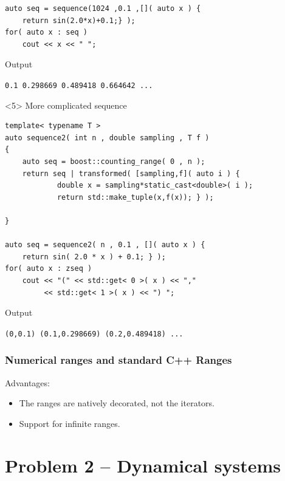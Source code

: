 \documentclass{beamer}
\newcommand{\heading}[1]{\frametitle{#1}}
\newcommand{\sectionslide}[1]{\frame{\begin{centerline}{\LARGE #1}\end{centerline}}}
\begin{document}
\begin{frame}[fragile]
\begin{onlyenv}
\begin{lstlisting}[basicstyle=\scriptsize\ttfamily]
auto seq = sequence(1024 ,0.1 ,[]( auto x ) {
    return sin(2.0*x)+0.1;} );
for( auto x : seq )
    cout << x << " ";
\end{lstlisting}
\vspace{2ex}Output

\vspace{0.5ex}\lstinline$0.1 0.298669 0.489418 0.664642 ...$
 \end{onlyenv}
 \begin{onlyenv}<5>
  More complicated sequence
\begin{lstlisting}[basicstyle=\scriptsize\ttfamily]
template< typename T >
auto sequence2( int n , double sampling , T f )
{
    auto seq = boost::counting_range( 0 , n );
    return seq | transformed( [sampling,f]( auto i ) {
            double x = sampling*static_cast<double>( i );
            return std::make_tuple(x,f(x)); } );

}

auto seq = sequence2( n , 0.1 , []( auto x ) {
    return sin( 2.0 * x ) + 0.1; } );
for( auto x : zseq )
    cout << "(" << std::get< 0 >( x ) << ","
         << std::get< 1 >( x ) << ") ";
\end{lstlisting}
\vspace{2ex}Output

\vspace{0.5ex}\lstinline$(0,0.1) (0.1,0.298669) (0.2,0.489418) ...$
 \end{onlyenv}
\end{frame}


\begin{frame}[fragile]
  \heading{Numerical ranges and standard C++ Ranges}
  
  Advantages:
  \begin{itemize}
   \item The ranges are natively decorated, not the iterators.
   \item Support for infinite ranges.
  \end{itemize}

 
\end{frame}


\section{Problem 2 -- Dynamical systems}

\sectionslide{Dynamical systems}
\end{document}
